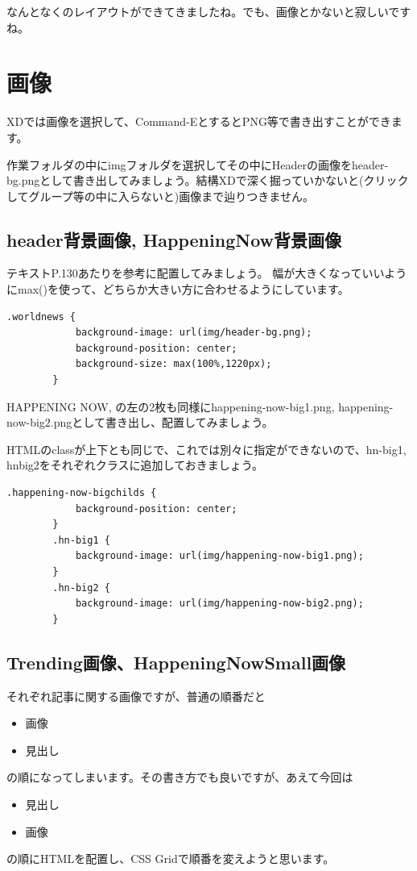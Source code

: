 \documentclass[mingoth,11pt,a4j,uplatex,dvipdfmx]{jsarticle}
\begin{document}
なんとなくのレイアウトができてきましたね。でも、画像とかないと寂しいですね。

\section{画像}
XDでは画像を選択して、Command-EとするとPNG等で書き出すことができます。

作業フォルダの中にimgフォルダを選択してその中にHeaderの画像をheader-bg.pngとして書き出してみましょう。結構XDで深く掘っていかないと(クリックしてグループ等の中に入らないと)画像まで辿りつきません。

\subsection{header背景画像, HappeningNow背景画像}

テキストP.130あたりを参考に配置してみましょう。
幅が大きくなっていいようにmax()を使って、どちらか大きい方に合わせるようにしています。

\begin{lstlisting}[caption=header画像のレイアウト]
        .worldnews {
            background-image: url(img/header-bg.png);
            background-position: center;
            background-size: max(100%,1220px);
        }
\end{lstlisting}

HAPPENING NOW, の左の2枚も同様にhappening-now-big1.png, happening-now-big2.pngとして書き出し、配置してみましょう。

HTMLのclassが上下とも同じで、これでは別々に指定ができないので、hn-big1, hnbig2をそれぞれクラスに追加しておきましょう。

\begin{lstlisting}[caption=happening-now-big画像のレイアウト]
        .happening-now-bigchilds {
            background-position: center;
        }
        .hn-big1 {
            background-image: url(img/happening-now-big1.png);
        }
        .hn-big2 {
            background-image: url(img/happening-now-big2.png);
        }
\end{lstlisting}

\subsection{Trending画像、HappeningNowSmall画像}
それぞれ記事に関する画像ですが、普通の順番だと
\begin{itemize}
\item 画像
\item 見出し
\end{itemize}
の順になってしまいます。その書き方でも良いですが、あえて今回は
\begin{itemize}
\item 見出し
\item 画像
\end{itemize}
の順にHTMLを配置し、CSS Gridで順番を変えようと思います。
\end{document}

